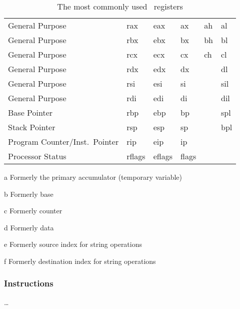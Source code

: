 \begin{table*}
  \centering
  \renewcommand\theadfont{\normalcolor\normalsize\normalfont}
  \begin{threeparttable}
    \caption{The most commonly used \arch\ registers}\label{tbl:regs}
    \begin{tabular}{lAAAAA}
      \toprule
       &  &  &
       &  &  \\
      \midrule
      General Purpose & rax & eax & ax & ah & al \\
      General Purpose & rbx & ebx & bx & bh & bl \\
      General Purpose & rcx & ecx & cx & ch & cl \\
      General Purpose & rdx & edx & dx & & dl \\
      General Purpose & rsi & esi & si & & sil \\
      General Purpose & rdi & edi & di & & dil \\
      Base Pointer & rbp & ebp & bp & & spl \\
      Stack Pointer & rsp & esp & sp & & bpl \\
      Program Counter/Inst.\ Pointer & rip & eip & ip \\
      Processor Status & rflags & eflags & flags \\
      \bottomrule
    \end{tabular}
    \begin{tablenotes}
      \item[a] Formerly the primary accumulator (temporary variable)%
      \item[b] Formerly base%
      \item[c] Formerly counter%
      \item[d] Formerly data%
      \item[e] Formerly source index for string operations
      \item[f] Formerly destination index for string operations
    \end{tablenotes}
  \end{threeparttable}
\end{table*}

\subsubsection{Instructions}
\todo\dots

